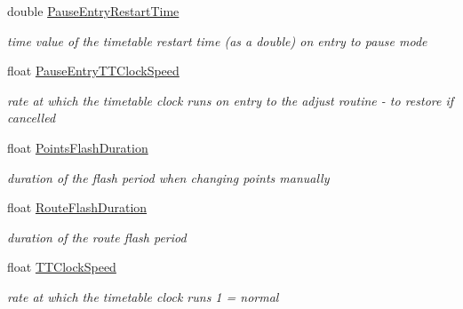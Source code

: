 \begin{DoxyCompactItemize}
\mbox{\label{class_t_interface_a32337255881759fc912873adc8f203fc}} 
double \mbox{\hyperlink{class_t_interface_a32337255881759fc912873adc8f203fc}{Pause\+Entry\+Restart\+Time}}
\begin{DoxyCompactList}\small\item\em time value of the timetable restart time (as a double) on entry to pause mode \end{DoxyCompactList}\item 
\mbox{\label{class_t_interface_ac5ac42893d5e251c3f2be594981e1155}} 
float \mbox{\hyperlink{class_t_interface_ac5ac42893d5e251c3f2be594981e1155}{Pause\+Entry\+T\+T\+Clock\+Speed}}
\begin{DoxyCompactList}\small\item\em rate at which the timetable clock runs on entry to the adjust routine -\/ to restore if cancelled \end{DoxyCompactList}\item 
\mbox{\label{class_t_interface_a19373a8d9b089feaf0c68f3f2e21864b}} 
float \mbox{\hyperlink{class_t_interface_a19373a8d9b089feaf0c68f3f2e21864b}{Points\+Flash\+Duration}}
\begin{DoxyCompactList}\small\item\em duration of the flash period when changing points manually \end{DoxyCompactList}\item 
\mbox{\label{class_t_interface_a0df2d6af5d41d428ad35892aea82098c}} 
float \mbox{\hyperlink{class_t_interface_a0df2d6af5d41d428ad35892aea82098c}{Route\+Flash\+Duration}}
\begin{DoxyCompactList}\small\item\em duration of the route flash period \end{DoxyCompactList}\item 
\mbox{\label{class_t_interface_aa6c357f4fb2a415dd9afe2f8b64146b7}} 
float \mbox{\hyperlink{class_t_interface_aa6c357f4fb2a415dd9afe2f8b64146b7}{T\+T\+Clock\+Speed}}
\begin{DoxyCompactList}\small\item\em rate at which the timetable clock runs 1 = normal \end{DoxyCompactList}\item 

\end{DoxyCompactItemize}
